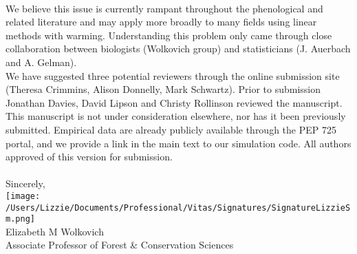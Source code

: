 \documentclass[11pt,a4paper]{article}
\begin{document}
\vspace{1.5ex}\\
We believe this issue is currently rampant throughout the phenological \citep[e.g.,][]{fu2015,Samplonius:2018aa,vitasse2018,meng2020} and related literature \citep[e.g.,][]{piao2017} and may apply more broadly to many fields using linear methods with warming. Understanding this problem only came through close collaboration between biologists (Wolkovich group) and statisticians (J. Auerbach and A. Gelman). 
\vspace{1.5ex}\\
We have suggested three potential reviewers through the online submission site (Theresa Crimmins, Alison Donnelly, Mark Schwartz). Prior to submission Jonathan Davies, David Lipson and Christy Rollinson reviewed the manuscript. This manuscript is not under consideration elsewhere, nor has it been previously submitted. Empirical data are already publicly available through the PEP 725 portal, and we provide a link in the main text to our simulation code. All authors approved of this version for submission. \\
\vspace{1.5ex}\\
Sincerely,\\

\texttt{[image: /Users/Lizzie/Documents/Professional/Vitas/Signatures/SignatureLizzieSm.png]} \\

\noindent Elizabeth M Wolkovich\\
Associate Professor of Forest \& Conservation Sciences\\ 


\end{document}
